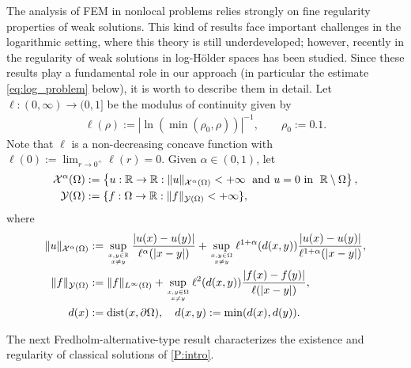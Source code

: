 \documentclass[11 pt]{article}
\numberwithin{equation}{section}
\def\dist{\operatorname{dist}}
\def\R{\mathbb{R}}
\begin{document}
The analysis of FEM in nonlocal problems relies strongly on fine regularity properties of weak solutions. This kind of results face important challenges in the logarithmic setting, where this theory is still underdeveloped; however, recently in \cite{CS22} the regularity of weak solutions in log-Hölder spaces has been studied.  Since these results play a fundamental role in our approach (in particular the estimate \eqref{eq:log_problem} below), it is worth to describe them in detail. Let $\ell:(0,\infty)\to (0,1]$ be the modulus of continuity given by
\begin{align}\label{ell:def}
\ell(\rho) := |\ln(\min(\rho_0,\rho))|^{-1}, \qquad\rho_0:=0.1.
\end{align}
Note that $\ell$ is a non-decreasing concave function with $\ell(0) := \lim_{r\to0^+}\ell(r)=0$. Given $\alpha\in(0,1)$, let
%
\begin{align}
    \mathcal X^\alpha(\Omega)&:=\left\{u:\mathbb R\to \mathbb R:\|u\|_{\mathcal{X}^\alpha(\Omega)}<+\infty \;\textnormal{ and $u=0$ in }\; \R\setminus \Omega\right\}, \label{Xdef}\\
    \mathcal Y(\Omega)&:=\{f:\Omega\to \mathbb R:\|f\|_{\mathcal Y(\Omega)}<+\infty\},\notag
\end{align}
%
where
%
\begin{align*}
    \|u\|_{\mathcal X^\alpha(\Omega)}&:=\sup_{
    \genfrac{}{}{0pt}{}{x,y\in\mathbb R}{x\neq y}
    }\frac{|u(x)-u(y)|}{\ell^{\alpha}(|x-y|)}+\sup_{
\genfrac{}{}{0pt}{}{x,y\in\Omega}{x\neq y}
    }\ell^{1+\alpha}(d(x,y))\frac{|u(x)-u(y)|}{\ell^{1+\alpha}(|x-y|)}, \\
    \|f\|_{\mathcal Y(\Omega)}&:=\|f\|_{L^\infty(\Omega)}+\sup_{
    \genfrac{}{}{0pt}{}{x,y\in\Omega}{x\neq y}
    }\ell^{2}(d(x,y))\frac{|f(x)-f(y)|}{\ell(|x-y  |)}, \\
    d(x)&:=\dist(x,\partial \Omega), \quad d(x,y):=\min(d(x),d(y)).
\end{align*}

The next Fredholm-alternative-type result characterizes the existence and regularity of classical solutions of \eqref{P:intro}.
\end{document}
